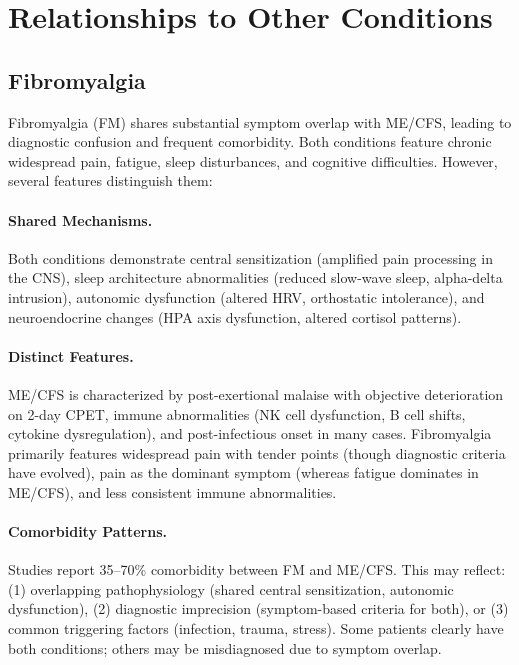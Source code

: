 \section{Relationships to Other Conditions}
\label{sec:related-conditions}

\subsection{Fibromyalgia}

Fibromyalgia (FM) shares substantial symptom overlap with ME/CFS, leading to diagnostic confusion and frequent comorbidity. Both conditions feature chronic widespread pain, fatigue, sleep disturbances, and cognitive difficulties. However, several features distinguish them:

\paragraph{Shared Mechanisms.}
Both conditions demonstrate central sensitization (amplified pain processing in the CNS), sleep architecture abnormalities (reduced slow-wave sleep, alpha-delta intrusion), autonomic dysfunction (altered HRV, orthostatic intolerance), and neuroendocrine changes (HPA axis dysfunction, altered cortisol patterns).

\paragraph{Distinct Features.}
ME/CFS is characterized by post-exertional malaise with objective deterioration on 2-day CPET, immune abnormalities (NK cell dysfunction, B cell shifts, cytokine dysregulation), and post-infectious onset in many cases. Fibromyalgia primarily features widespread pain with tender points (though diagnostic criteria have evolved), pain as the dominant symptom (whereas fatigue dominates in ME/CFS), and less consistent immune abnormalities.

\paragraph{Comorbidity Patterns.}
Studies report 35--70\% comorbidity between FM and ME/CFS. This may reflect: (1) overlapping pathophysiology (shared central sensitization, autonomic dysfunction), (2) diagnostic imprecision (symptom-based criteria for both), or (3) common triggering factors (infection, trauma, stress). Some patients clearly have both conditions; others may be misdiagnosed due to symptom overlap.

